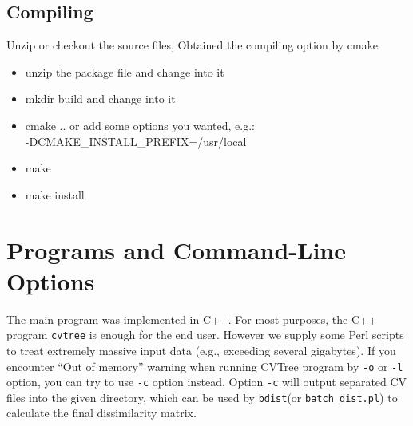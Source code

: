 \documentclass[a4paper,12pt]{article}
\begin{document}
\subsection{Compiling}
Unzip or checkout the source files, Obtained the compiling option by
cmake
\begin{itemize}
	\item unzip the package file and change into it
	\item mkdir build and change into it
	\item cmake .. or add some options you wanted, e.g.:\\ -DCMAKE\_INSTALL\_PREFIX=/usr/local
	\item make
	\item make install
\end{itemize}

\section{Programs and Command-Line Options}

The main program was implemented in C++. For most purposes, the C++
program \verb!cvtree! is enough for the end user. However we supply some
Perl scripts to treat extremely massive input data (e.g., exceeding
several gigabytes). If you encounter ``Out of memory'' warning when
running CVTree program by \verb!-o! or \verb!-l! option, you can try to
use \verb!-c! option instead. Option \verb!-c! will output separated CV
files into the given directory, which can be used by \verb!bdist!(or
\verb!batch_dist.pl!) to calculate the final dissimilarity matrix.
\end{document}
